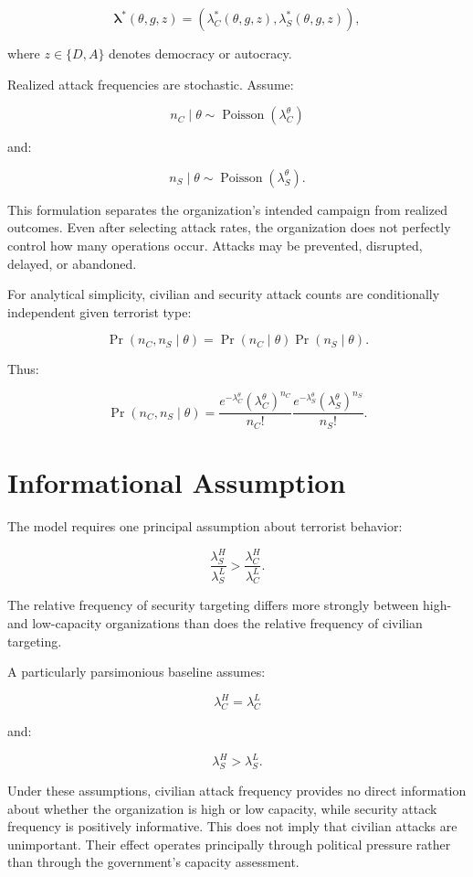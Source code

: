 \documentclass[
  letterpaper,
  DIV=11,
  numbers=noendperiod]{scrartcl}
\begin{document}
\[
\boldsymbol{\lambda}^*(\theta,g,z)
=
\left(
\lambda_C^*(\theta,g,z),
\lambda_S^*(\theta,g,z)
\right),
\]

where \(z\in\{D,A\}\) denotes democracy or autocracy.

Realized attack frequencies are stochastic. Assume:

\[
n_C\mid\theta\sim\operatorname{Poisson}(\lambda_C^\theta)
\]

and:

\[
n_S\mid\theta\sim\operatorname{Poisson}(\lambda_S^\theta).
\]

This formulation separates the organization's intended campaign from
realized outcomes. Even after selecting attack rates, the organization
does not perfectly control how many operations occur. Attacks may be
prevented, disrupted, delayed, or abandoned.

For analytical simplicity, civilian and security attack counts are
conditionally independent given terrorist type:

\[
\Pr(n_C,n_S\mid\theta)
=
\Pr(n_C\mid\theta)\Pr(n_S\mid\theta).
\]

Thus:

\[
\Pr(n_C,n_S\mid\theta)
=
\frac{e^{-\lambda_C^\theta}(\lambda_C^\theta)^{n_C}}{n_C!}
\frac{e^{-\lambda_S^\theta}(\lambda_S^\theta)^{n_S}}{n_S!}.
\tag{1}
\]

\section{Informational Assumption}\label{informational-assumption}

The model requires one principal assumption about terrorist behavior:

\[
\boxed{
\frac{\lambda_S^H}{\lambda_S^L}
>
\frac{\lambda_C^H}{\lambda_C^L}.
}
\tag{A1}
\]

The relative frequency of security targeting differs more strongly
between high- and low-capacity organizations than does the relative
frequency of civilian targeting.

A particularly parsimonious baseline assumes:

\[
\lambda_C^H=\lambda_C^L
\tag{A1a}
\]

and:

\[
\lambda_S^H>\lambda_S^L.
\tag{A1b}
\]

Under these assumptions, civilian attack frequency provides no direct
information about whether the organization is high or low capacity,
while security attack frequency is positively informative. This does not
imply that civilian attacks are unimportant. Their effect operates
principally through political pressure rather than through the
government's capacity assessment.
\end{document}
